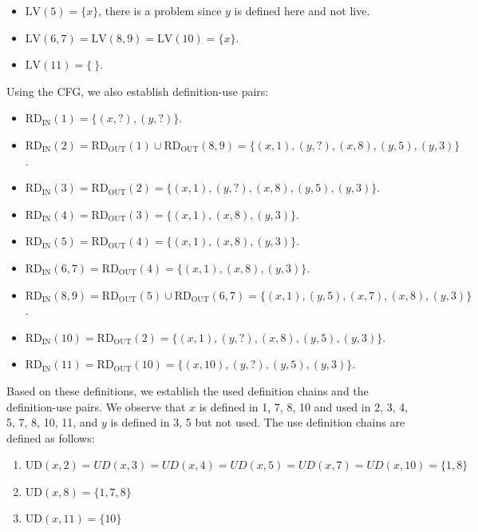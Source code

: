 \begin{example}
\begin{itemize}
        \item $\text{LV}(5)=\{x\}$, there is a problem since $y$ is defined here and not live. 
        \item $\text{LV}(6,7)=\text{LV}(8,9)=\text{LV}(10)=\{x\}$.
        \item $\text{LV}(11)=\{\:\}$.
    \end{itemize}
    Using the CFG, we also establish definition-use pairs:
    \begin{itemize}
        \item $\text{RD}_{\text{IN}}(1) = \{ (x,?), (y,?) \}$.
        \item $\text{RD}_{\text{IN}}(2) = \text{RD}_{\text{OUT}}(1) \cup \text{RD}_{\text{OUT}} (8,9) = \{ (x,1), (y,?), (x,8), (y, 5), (y, 3) \}$.
        \item $\text{RD}_{\text{IN}}(3) = \text{RD}_{\text{OUT}}(2) = \{ (x,1), (y,?) , (x, 8), (y, 5), (y, 3)\}$.
        \item $\text{RD}_{\text{IN}}(4) = \text{RD}_{\text{OUT}}(3) = \{ (x,1), (x, 8), (y, 3)\}$.
        \item $\text{RD}_{\text{IN}}(5) = \text{RD}_{\text{OUT}}(4) = \{ (x,1), (x, 8), (y, 3)\}$.
        \item $\text{RD}_{\text{IN}}(6,7) = \text{RD}_{\text{OUT}}(4) =\{ (x,1), (x, 8), (y, 3)\}$.
        \item $\text{RD}_{\text{IN}}(8,9) = \text{RD}_{\text{OUT}}(5) \cup \text{RD}_{\text{OUT}}(6,7) = \{ (x,1), (y, 5), (x,7), (x, 8), (y, 3) \}$.
        \item $\text{RD}_{\text{IN}}(10) = \text{RD}_{\text{OUT}}(2) = \{ (x,1), (y,?) , (x, 8), (y, 5), (y,3)\}$.
        \item $\text{RD}_{\text{IN}}(11) = \text{RD}_{\text{OUT}}(10) = \{ (x,10), (y,?) , (y, 5), (y, 3)\}$.
    \end{itemize}
    Based on these definitions, we establish the used definition chains and the definition-use pairs. 
    We observe that $x$ is defined in 1, 7, 8, 10 and used in 2, 3, 4, 5, 7, 8, 10, 11, and $y$ is defined in 3, 5 but not used. 
    The use definition chains are defined as follows:
    \begin{enumerate} 
        \item $\text{UD}(x, 2) = UD(x, 3) = UD(x, 4) = UD(x, 5) = UD(x, 7) = UD(x, 10) = \{1, 8\}$
        \item $\text{UD}(x, 8) = \{1, 7, 8\}$
        \item $\text{UD}(x, 11) = \{10\}$
    \end{enumerate} 

\end{example}
